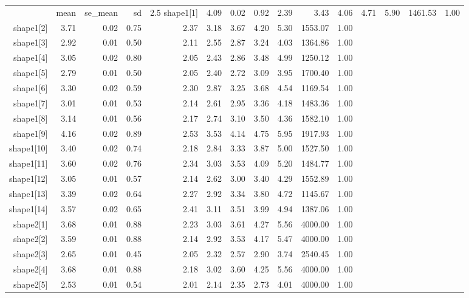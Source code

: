 \begin{longtable}{rrrrrrrrrrr}
  \hline
 & mean & se_mean & sd & 2.5%
  \hline \endhead  \hline
shape1[1] & 4.09 & 0.02 & 0.92 & 2.39 & 3.43 & 4.06 & 4.71 & 5.90 & 1461.53 & 1.00 \\ 
  shape1[2] & 3.71 & 0.02 & 0.75 & 2.37 & 3.18 & 3.67 & 4.20 & 5.30 & 1553.07 & 1.00 \\ 
  shape1[3] & 2.92 & 0.01 & 0.50 & 2.11 & 2.55 & 2.87 & 3.24 & 4.03 & 1364.86 & 1.00 \\ 
  shape1[4] & 3.05 & 0.02 & 0.80 & 2.05 & 2.43 & 2.86 & 3.48 & 4.99 & 1250.12 & 1.00 \\ 
  shape1[5] & 2.79 & 0.01 & 0.50 & 2.05 & 2.40 & 2.72 & 3.09 & 3.95 & 1700.40 & 1.00 \\ 
  shape1[6] & 3.30 & 0.02 & 0.59 & 2.30 & 2.87 & 3.25 & 3.68 & 4.54 & 1169.54 & 1.00 \\ 
  shape1[7] & 3.01 & 0.01 & 0.53 & 2.14 & 2.61 & 2.95 & 3.36 & 4.18 & 1483.36 & 1.00 \\ 
  shape1[8] & 3.14 & 0.01 & 0.56 & 2.17 & 2.74 & 3.10 & 3.50 & 4.36 & 1582.10 & 1.00 \\ 
  shape1[9] & 4.16 & 0.02 & 0.89 & 2.53 & 3.53 & 4.14 & 4.75 & 5.95 & 1917.93 & 1.00 \\ 
  shape1[10] & 3.40 & 0.02 & 0.74 & 2.18 & 2.84 & 3.33 & 3.87 & 5.00 & 1527.50 & 1.00 \\ 
  shape1[11] & 3.60 & 0.02 & 0.76 & 2.34 & 3.03 & 3.53 & 4.09 & 5.20 & 1484.77 & 1.00 \\ 
  shape1[12] & 3.05 & 0.01 & 0.57 & 2.14 & 2.62 & 3.00 & 3.40 & 4.29 & 1552.89 & 1.00 \\ 
  shape1[13] & 3.39 & 0.02 & 0.64 & 2.27 & 2.92 & 3.34 & 3.80 & 4.72 & 1145.67 & 1.00 \\ 
  shape1[14] & 3.57 & 0.02 & 0.65 & 2.41 & 3.11 & 3.51 & 3.99 & 4.94 & 1387.06 & 1.00 \\ 
  shape2[1] & 3.68 & 0.01 & 0.88 & 2.23 & 3.03 & 3.61 & 4.27 & 5.56 & 4000.00 & 1.00 \\ 
  shape2[2] & 3.59 & 0.01 & 0.88 & 2.14 & 2.92 & 3.53 & 4.17 & 5.47 & 4000.00 & 1.00 \\ 
  shape2[3] & 2.65 & 0.01 & 0.45 & 2.05 & 2.32 & 2.57 & 2.90 & 3.74 & 2540.45 & 1.00 \\ 
  shape2[4] & 3.68 & 0.01 & 0.88 & 2.18 & 3.02 & 3.60 & 4.25 & 5.56 & 4000.00 & 1.00 \\ 
  shape2[5] & 2.53 & 0.01 & 0.54 & 2.01 & 2.14 & 2.35 & 2.73 & 4.01 & 4000.00 & 1.00 \\ 

\end{longtable}
